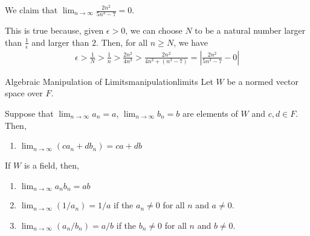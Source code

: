 
\begin{exmp}{}{}
	We claim that \(\lim_{n\to\infty} \frac{2n^2}{5n^3 - 7} = 0\).

	This is true because, given  \(\epsilon > 0\), we can choose \(N\) to be a natural number larger than \(\frac{1}{\epsilon}\) and larger than \(2\). Then, for all  \(n \geq N\), we have \begin{align*}
		\epsilon > \frac{1}{N} > \frac{1}{n} > \frac{2n^2}{4n^3} > \frac{2n^2}{4n^3 + (n^3 - 7)} = \left| \frac{2n^2}{5n^3 - 7} - 0 \right|
	\end{align*}
\end{exmp}

\begin{thm}{Algebraic Manipulation of Limits}{manipulationlimits}
	Let \(W\) be a normed vector space over \(F\).

	Suppose that \(\lim_{n\to\infty} a_n = a\), \(\lim_{n\to\infty} b_n = b\) are elements of \(W\) and \(c, d \in F\).
	Then, 
	\begin{enumerate}
		\item \(\lim_{n\to\infty} (ca_n + db_n) = ca + db\)
	\end{enumerate}

	If \(W\) is a field, then,
	\begin{enumerate}[resume]
		\item \(\lim_{n\to\infty} a_nb_n = ab\)
		\item \(\lim_{n\to\infty} (1/a_n) = 1/a\) if the \(a_n \neq 0\) for all  \(n\) and \(a \neq 0\).
		\item \(\lim_{n\to\infty} (a_n/b_n) = a/b\) if the \(b_n \neq 0\) for all  \(n\) and \(b \neq 0\).
	\end{enumerate} 
\end{thm}

